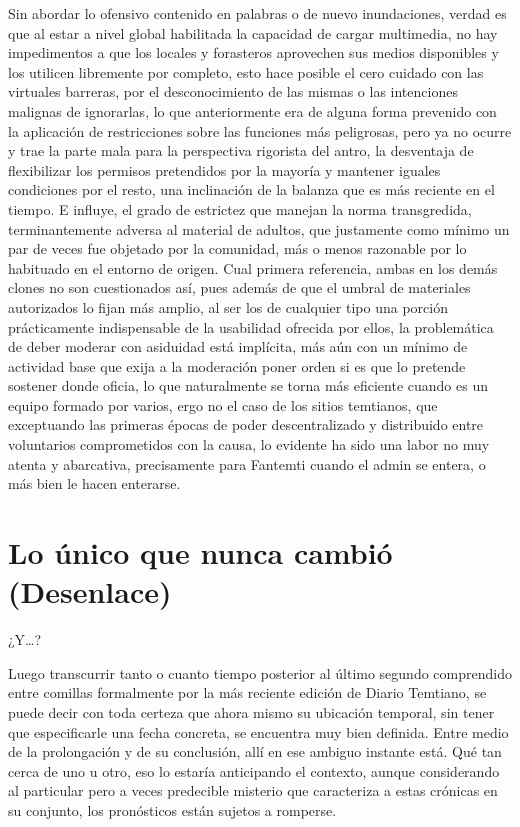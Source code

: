 \documentclass[
]{book}
\begin{document}
Sin abordar lo ofensivo contenido en palabras o de nuevo inundaciones, verdad es que al estar a nivel global habilitada la capacidad de cargar multimedia, no hay impedimentos a que los locales y forasteros aprovechen sus medios disponibles y los utilicen libremente por completo, esto hace posible el cero cuidado con las virtuales barreras, por el desconocimiento de las mismas o las intenciones malignas de ignorarlas, lo que anteriormente era de alguna forma prevenido con la aplicación de restricciones sobre las funciones más peligrosas, pero ya no ocurre y trae la parte mala para la perspectiva rigorista del antro, la desventaja de flexibilizar los permisos pretendidos por la mayoría y mantener iguales condiciones por el resto, una inclinación de la balanza que es más reciente en el tiempo. E influye, el grado de estrictez que manejan la norma transgredida, terminantemente adversa al material de adultos, que justamente como mínimo un par de veces fue objetado por la comunidad, más o menos razonable por lo habituado en el entorno de origen. Cual primera referencia, ambas en los demás clones no son cuestionados así, pues además de que el umbral de materiales autorizados lo fijan más amplio, al ser los de cualquier tipo una porción prácticamente indispensable de la usabilidad ofrecida por ellos, la problemática de deber moderar con asiduidad está implícita, más aún con un mínimo de actividad base que exija a la moderación poner orden si es que lo pretende sostener donde oficia, lo que naturalmente se torna más eficiente cuando es un equipo formado por varios, ergo no el caso de los sitios temtianos, que exceptuando las primeras épocas de poder descentralizado y distribuido entre voluntarios comprometidos con la causa, lo evidente ha sido una labor no muy atenta y abarcativa, precisamente para Fantemti cuando el admin se entera, o más bien le hacen enterarse.

\hypertarget{lo-uxfanico-que-nunca-cambiuxf3-desenlace}{%
\chapter{Lo único que nunca cambió (Desenlace)}\label{lo-uxfanico-que-nunca-cambiuxf3-desenlace}}

¿Y\ldots?

Luego transcurrir tanto o cuanto tiempo posterior al último segundo comprendido entre comillas formalmente por la más reciente edición de Diario Temtiano, se puede decir con toda certeza que ahora mismo su ubicación temporal, sin tener que especificarle una fecha concreta, se encuentra muy bien definida. Entre medio de la prolongación y de su conclusión, allí en ese ambiguo instante está. Qué tan cerca de uno u otro, eso lo estaría anticipando el contexto, aunque considerando al particular pero a veces predecible misterio que caracteriza a estas crónicas en su conjunto, los pronósticos están sujetos a romperse.
\end{document}
